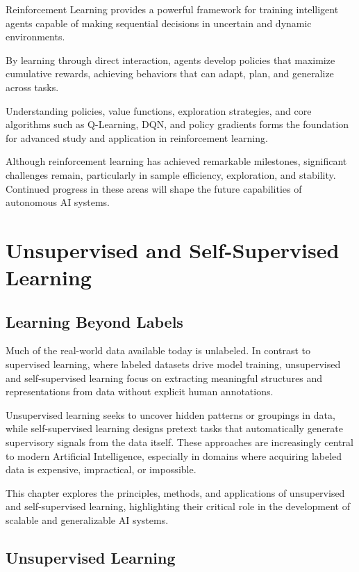 \documentclass[openany]{book}
\begin{document}
Reinforcement Learning provides a powerful framework for training intelligent 
agents capable of making sequential decisions in uncertain and dynamic 
environments.

By learning through direct interaction, agents develop policies that maximize 
cumulative rewards, achieving behaviors that can adapt, plan, and generalize 
across tasks.

Understanding policies, value functions, exploration strategies, and core 
algorithms such as Q-Learning, DQN, and policy gradients forms the foundation 
for advanced study and application in reinforcement learning.

Although reinforcement learning has achieved remarkable milestones, significant 
challenges remain, particularly in sample efficiency, exploration, and 
stability. Continued progress in these areas will shape the future capabilities 
of autonomous AI systems.

\chapter{Unsupervised and Self-Supervised Learning}

\section{Learning Beyond Labels}
Much of the real-world data available today is unlabeled. In contrast to 
supervised learning, where labeled datasets drive model training, unsupervised 
and self-supervised learning focus on extracting meaningful structures and 
representations from data without explicit human annotations.

Unsupervised learning seeks to uncover hidden patterns or groupings in data, 
while self-supervised learning designs pretext tasks that automatically generate 
supervisory signals from the data itself. These approaches are increasingly 
central to modern Artificial Intelligence, especially in domains where acquiring 
labeled data is expensive, impractical, or impossible.

This chapter explores the principles, methods, and applications of unsupervised 
and self-supervised learning, highlighting their critical role in the 
development of scalable and generalizable AI systems.

\section{Unsupervised Learning}
\end{document}
